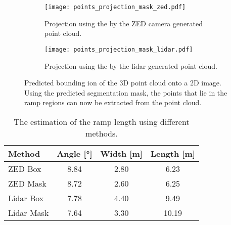 \begin{figure}[htb]
	\centering
	\begin{subfigure}{1\textwidth}
		\centering
		\texttt{[image: points\_projection\_mask\_zed.pdf]}
		\caption{Projection using the by the ZED camera generated point cloud.}
		\label{fig:points_projection_mask_zed}
	\end{subfigure}

	\begin{subfigure}{1\textwidth}
		\centering
		\texttt{[image: points\_projection\_mask\_lidar.pdf]}
		\caption{Projection using the by the \acrshort{lidar} generated point cloud.}
		\label{fig:points_projection_mask_lidar}
	\end{subfigure}
	\caption[Point cloud extraction using the predicted segmentation mask]{Predicted bounding ion of the 3D point cloud onto a 2D image. Using the predicted segmentation mask, the points that lie in the ramp regions can now be extracted from the point cloud.}
\end{figure}

\begin{table}[htb]
	\centering
	\caption[Ramp length]{The estimation of the ramp length using different methods.}
	\label{tab:cloud_extraction_estimation}
	\begin{tabular}{lSSS}
		\toprule
		\textbf{Method} & {\textbf{Angle} [\si{\degree}]} & {\textbf{Width} [\si{\metre}]} & {\textbf{Length} [\si{\metre}]} \\
		\midrule
		ZED Box         & 8.84                            & 2.80                           & 6.23                            \\
		ZED Mask        & 8.72                            & 2.60                           & 6.25                            \\
		Lidar Box       & 7.78                            & 4.40                           & 9.49                            \\
		Lidar Mask      & 7.64                            & 3.30                           & 10.19                           \\
		\bottomrule
	\end{tabular}
\end{table}